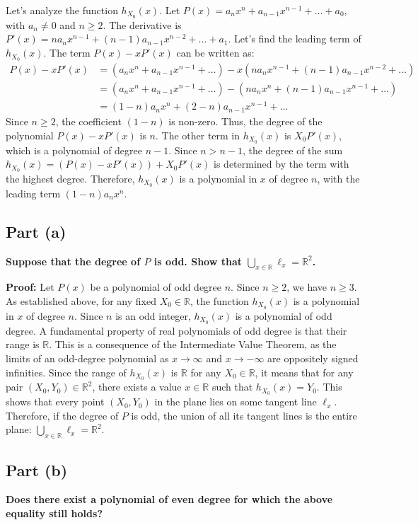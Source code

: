 \documentclass[12pt,a4paper]{article}
\theoremstyle{definition}
\begin{document}
Let's analyze the function $h_{X_0}(x)$. Let $P(x) = a_n x^n + a_{n-1} x^{n-1} + \dots + a_0$, with $a_n \neq 0$ and $n \geq 2$.
The derivative is $P'(x) = n a_n x^{n-1} + (n-1) a_{n-1} x^{n-2} + \dots + a_1$.
Let's find the leading term of $h_{X_0}(x)$. The term $P(x) - xP'(x)$ can be written as:
\begin{align*}
P(x) - xP'(x) &= (a_n x^n + a_{n-1} x^{n-1} + \dots) - x(n a_n x^{n-1} + (n-1) a_{n-1} x^{n-2} + \dots) \\
&= (a_n x^n + a_{n-1} x^{n-1} + \dots) - (n a_n x^n + (n-1) a_{n-1} x^{n-1} + \dots) \\
&= (1-n)a_n x^n + (2-n)a_{n-1} x^{n-1} + \dots
\end{align*}
Since $n \geq 2$, the coefficient $(1-n)$ is non-zero. Thus, the degree of the polynomial $P(x) - xP'(x)$ is $n$.
The other term in $h_{X_0}(x)$ is $X_0 P'(x)$, which is a polynomial of degree $n-1$.
Since $n > n-1$, the degree of the sum $h_{X_0}(x) = (P(x) - xP'(x)) + X_0 P'(x)$ is determined by the term with the highest degree. Therefore, $h_{X_0}(x)$ is a polynomial in $x$ of degree $n$, with the leading term $(1-n)a_n x^n$.

\subsection*{Part (a)}
\textbf{Suppose that the degree of $P$ is odd. Show that $\bigcup_{x\in\mathbb{R}}\ell_x = \mathbb{R}^2$.}

\textbf{Proof:}
Let $P(x)$ be a polynomial of odd degree $n$. Since $n \geq 2$, we have $n \geq 3$.
As established above, for any fixed $X_0 \in \mathbb{R}$, the function $h_{X_0}(x)$ is a polynomial in $x$ of degree $n$.
Since $n$ is an odd integer, $h_{X_0}(x)$ is a polynomial of odd degree. A fundamental property of real polynomials of odd degree is that their range is $\mathbb{R}$. This is a consequence of the Intermediate Value Theorem, as the limits of an odd-degree polynomial as $x \to \infty$ and $x \to -\infty$ are oppositely signed infinities.
Since the range of $h_{X_0}(x)$ is $\mathbb{R}$ for any $X_0 \in \mathbb{R}$, it means that for any pair $(X_0, Y_0) \in \mathbb{R}^2$, there exists a value $x \in \mathbb{R}$ such that $h_{X_0}(x) = Y_0$.
This shows that every point $(X_0, Y_0)$ in the plane lies on some tangent line $\ell_x$.
Therefore, if the degree of $P$ is odd, the union of all its tangent lines is the entire plane: $\bigcup_{x \in \mathbb{R}} \ell_x = \mathbb{R}^2$.

\subsection*{Part (b)}
\textbf{Does there exist a polynomial of even degree for which the above equality still holds?}
\end{document}
